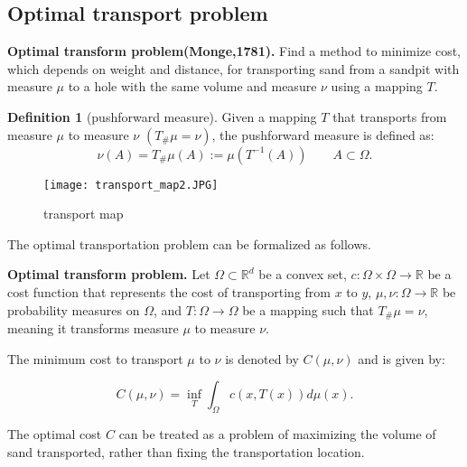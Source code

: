 \documentclass[a4j,10pt, twocolumn, dvipdfmx]{article}
\theoremstyle{definition}
\newtheorem{dfn}{Definition}[section]
\begin{document}
\subsection{Optimal transport problem}
\textbf{Optimal transform problem(Monge,1781).}
Find a method to minimize cost, 
which depends on weight and distance, 
for transporting sand from a sandpit with measure $\mu$ to a hole with the same volume and measure $\nu$ using a mapping $T$.

\begin{dfn}[pushforward measure]
    Given a mapping $T$ that transports from measure $\mu$ to measure $\nu$ $(T_\#\mu = \nu)$, 
    the pushforward measure is defined as:
    \begin{equation*}
        \nu (A) =  T_\#\mu (A) := \mu (T^{-1} (A)) \qquad A \subset \Omega.
    \end{equation*}
\end{dfn}

\begin{figure}[htbp]
    \begin{center}
        \texttt{[image: transport\_map2.JPG]}
        \caption{transport map}
    \end{center}
\end{figure}

The optimal transportation problem can be formalized as follows.
\newline

\textbf{Optimal transform problem.}
Let $\Omega \subset \mathbb{R}^d$ be a convex set,
$c: \Omega \times \Omega \to \mathbb{R}$ be a cost function that represents the cost of transporting from $x$ to $y$, 
$\mu, \nu : \Omega \to \mathbb{R}$ be probability measures on $\Omega$, and $T: \Omega \to \Omega$ be a mapping such that $T_\#\mu = \nu$, 
meaning it transforms measure $\mu$ to measure $\nu$.

The minimum cost to transport $\mu$ to $\nu$ is denoted by $C(\mu, \nu)$ and is given by:

\begin{equation*}
    C(\mu, \nu) = \inf_T \int_\Omega c(x, T(x)) d \mu (x).
\end{equation*}

The optimal cost $C$ can be treated as a problem of maximizing the volume of sand transported, 
rather than fixing the transportation location.
\newline
\end{document}
